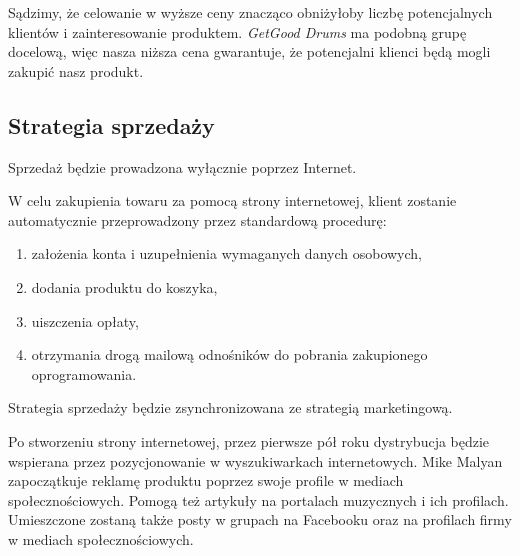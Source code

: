 \documentclass[12pt]{article}
\begin{document}
Sądzimy, że celowanie w wyższe ceny znacząco obniżyłoby liczbę potencjalnych klientów i zainteresowanie produktem.
\textit{GetGood Drums} ma podobną grupę docelową, więc nasza niższa cena gwarantuje, że potencjalni klienci będą mogli zakupić nasz produkt.



\subsection{Strategia sprzedaży}


Sprzedaż będzie prowadzona wyłącznie poprzez Internet.

W celu zakupienia towaru za pomocą strony internetowej, klient zostanie automatycznie przeprowadzony przez standardową procedurę:
\begin{enumerate}
    \item założenia konta i uzupełnienia wymaganych danych osobowych,
    \item dodania produktu do koszyka,
    \item uiszczenia opłaty,
    \item otrzymania drogą mailową odnośników do pobrania zakupionego oprogramowania.
\end{enumerate}

Strategia sprzedaży będzie zsynchronizowana ze strategią marketingową.

Po stworzeniu strony internetowej, przez pierwsze pół roku dystrybucja będzie wspierana przez pozycjonowanie w wyszukiwarkach internetowych.
Mike Malyan zapoczątkuje reklamę produktu poprzez swoje profile w mediach społecznościowych.
Pomogą też artykuły na portalach muzycznych i ich profilach.
Umieszczone zostaną także posty w grupach na Facebooku oraz na profilach firmy w mediach społecznościowych.
\end{document}
